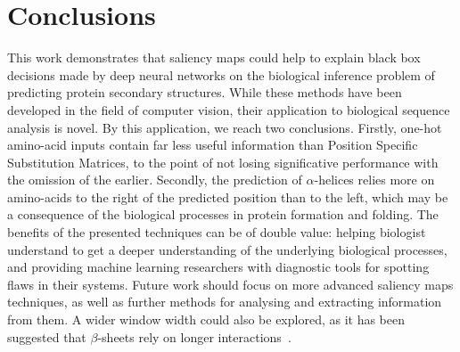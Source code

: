 \documentclass{article}
\begin{document}



\section{Conclusions}
\label{sec:conclusions}

This work demonstrates that saliency maps could help to explain black box decisions made by deep neural networks on the biological inference problem of predicting protein secondary structures. While these methods have been developed in the field of computer vision, their application to biological sequence analysis is novel.
By this application, we reach two conclusions.
Firstly, one-hot amino-acid inputs contain far less useful information than Position Specific Substitution Matrices, to the point of not losing significative performance with the omission of the earlier.
Secondly, the prediction of $\alpha$-helices relies more on amino-acids to the right of the predicted position than to the left, which may be a consequence of the biological processes in protein formation and folding.
The benefits of the presented techniques can be of double value: helping biologist understand to get a deeper understanding of the underlying biological processes, and providing machine learning researchers with diagnostic tools for spotting flaws in their systems.
Future work should focus on more advanced saliency maps techniques, as well as further methods for analysing and extracting information from them. A wider window width could also be explored, as it has been suggested that $\beta$-sheets rely on longer interactions~\cite{Zhou2018,10.1007/978-3-642-16001-1_30}.
\end{document}
